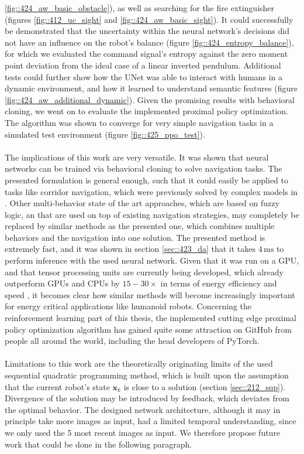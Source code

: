 \ref{fig::424_aw_basic_obstacle}), as well as searching for the fire extinguisher (figures \ref{fig::412_uc_sight} and \ref{fig::424_aw_basic_sight}). It could successfully be demonstrated that the uncertainty within the neural network's decisions did not have an influence on the robot's balance (figure \ref{fig::424_entropy_balance}), for which we evaluated the command signal's entropy against the zero moment point deviation from the ideal case of a linear inverted pendulum. Additional tests could further show how the UNet was able to interact with humans in a dynamic environment, and how it learned to understand semantic features (figure \ref{fig::424_aw_additional_dynamic}). Given the promising results with behavioral cloning, we went on to evaluate the implemented proximal policy optimization. The algorithm was shown to converge for very simple navigation tasks in a simulated test environment (figure \ref{fig::425_ppo_test}).
\\\\
The implications of this work are very versatile. It was shown that neural networks can be trained via behavioral cloning to solve navigation tasks. The presented formulation is general enough, such that it could easily be applied to tasks like corridor navigation, which were previously solved by complex models in \cite{faragasso2013vision}. Other multi-behavior state of the art approaches, which are based on fuzzy logic, an that are used on top of existing navigation strategies, may completely be replaced by similar methods as the presented one, which combines multiple behaviors and the navigation into one solution. The presented method is extremely fast, and it was shown in section \ref{sec::423_da} that it takes $4\,\text{ms}$ to perform inference with the used neural network. Given that it was run on a GPU, and that tensor processing units are currently being developed, which already outperform GPUs and CPUs by $15-30\times$ in terms of energy efficiency and speed \cite{jouppi2017datacenter}, it becomes clear how similar methods will become increasingly important for energy critical applications like humanoid robots. Concerning the reinforcement learning part of this thesis, the implemented cutting edge proximal policy optimization algorithm has gained quite some attraction on GitHub from people all around the world, including the head developers of PyTorch.
\\\\
Limitations to this work are the theoretically originating limits of the used sequential quadratic programming method, which is built upon the assumption that the current robot's state $\bm{x}_k$ is close to a solution (section \ref{sec::212_sqp}). Divergence of the solution may be introduced by feedback, which deviates from the optimal behavior. The designed network architecture, although it may in principle take more images as input, had a limited temporal understanding, since we only used the 5 most recent images as input. We therefore propose future work that could be done in the following paragraph.
